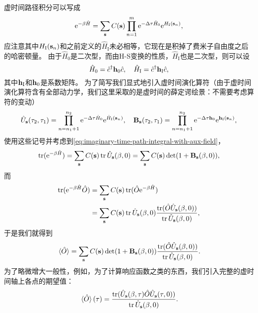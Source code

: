 \documentclass[hyperref, UTF8, a4paper]{ctexart}
\newcommand*{\ee}{\mathrm{e}}
\begin{document}
虚时间路径积分可以写成
\begin{equation}
    \ee^{-\beta \hat{H}} = \sum_{\vb{s}} C(\vb{s}) \prod_{n=1}^m \ee^{-\Delta \tau \hat{H}_0} \ee^{H_\text{I}(\vb{s}_n)}, 
    \label{eq:imaginary-time-path-integral-with-aux-field}
\end{equation}
应注意其中$H_\text{I}(\vb{s}_n)$和之前定义的$\hat{H}_\text{I}$未必相等，它现在是积掉了费米子自由度之后的哈密顿量。
由于$\hat{H}_0$是二次型，而由H-S变换的性质，$\hat{H}_\text{I}$也是二次型，则可以设
\begin{equation}
    \hat{H}_0 = \hat{c}^\dagger \vb{h}_0 \hat{c}, \quad \hat{H}_\text{I} = \hat{c}^\dagger \vb{h}_\text{I} \hat{c},
\end{equation}
其中$\vb{h}_\text{I}$和$\vb{h}_0$是系数矩阵。
为了简写我们显式地引入虚时间演化算符（由于虚时间演化算符含有全部动力学，我们这里采取的是虚时间的薛定谔绘景：不需要考虑算符的变动）
\begin{equation}
    \hat{U}_{\vb{s}}(\tau_2, \tau_1) = \prod_{n=n_1+1}^{n_2} \ee^{-\Delta \tau \hat{H}_0} \ee^{ \hat{H}_\text{I}(\vb{s}_n)}, \quad \vb{B}_{\vb{s}}(\tau_2, \tau_1) = \prod_{n=n_1+1}^{n_2} \ee^{-\Delta \tau \vb{h}_0} \ee^{\vb{h}_\text{I}(\vb{s}_n)},
\end{equation}
使用这些记号并考虑到\eqref{eq:imaginary-time-path-integral-with-aux-field}，
\[
    \trace(\ee^{-\beta \hat{H}}) = \sum_{\vb{s}} C(\vb{s}) \trace \hat{U}_{\vb{s}}(\beta, 0) = \sum_{\vb{s}} C(\vb{s}) \det(1 + \vb{B}_{\vb{s}}(\beta, 0)),
\]
而
\[
    \begin{aligned}
        \trace(\ee^{-\beta \hat{H}} \hat{O}) &= \sum_{\vb{s}} C(\vb{s}) \trace(\hat{O} \ee^{-\beta \hat{H}}) \\
        &= \sum_{\vb{s}} C(\vb{s}) \trace\hat{U}_{\vb{s}}(\beta, 0) \frac{\trace(\hat{O} \hat{U}_{\vb{s}}(\beta, 0))}{\trace \hat{U}_{\vb{s}}(\beta, 0)},
    \end{aligned} 
\]
于是我们就得到
\begin{equation}
    \expval*{\hat{O}} = \sum_{\vb{s}} C(\vb{s}) \det(1 + \vb{B}_{\vb{s}}(\beta, 0)) \frac{\trace(\hat{O} \hat{U}_{\vb{s}}(\beta, 0))}{\trace \hat{U}_{\vb{s}}(\beta, 0)}.
\end{equation}
为了略微增大一般性，例如，为了计算响应函数之类的东西，我们引入完整的虚时间轴上各点的期望值：
\begin{equation}
    \expval*{\hat{O}}(\tau) = \frac{\trace(\hat{U}_{\vb{s}}(\beta, \tau) \hat{O} \hat{U}_{\vb{s}}(\tau, 0))}{\trace \hat{U}_{\vb{s}}(\beta, 0)}.
\end{equation}
\end{document}
